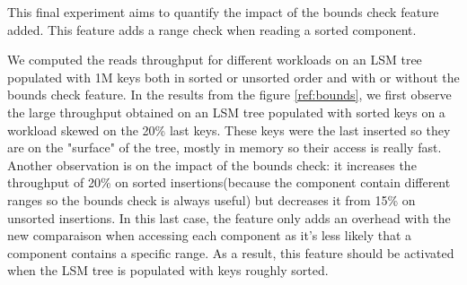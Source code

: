 \documentclass{sig-alternate-05-2015}
\begin{document}
This final experiment aims to quantify the impact of the bounds check feature added. This feature adds a range check when reading a sorted component. 

We computed the reads throughput for different workloads on an LSM tree populated with 1M keys both in sorted or unsorted order and with or without the bounds check feature. In the results from the figure \ref{ref:bounds}, we first observe the large throughput obtained on an LSM tree populated with sorted keys on a workload skewed on the 20\% last keys. These keys were the last inserted so they are on the "surface" of the tree, mostly in memory so their access is really fast. Another observation is on the impact of the bounds check: it increases the throughput of 20\% on sorted insertions(because the component contain different ranges so the bounds check is always useful) but decreases it from 15\% on unsorted insertions. In this last case, the feature only adds an overhead with the new comparaison when accessing each component as it's less likely that a component contains a specific range. As a result, this feature should be activated when the LSM tree is populated with keys roughly sorted.
\end{document}
